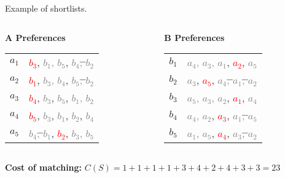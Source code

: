 \documentclass[aspectratio=169,xcolor=dvipsnames]{beamer}
\begin{document}
\begin{frame}{Example of shortlists.}
    \begin{columns}[t]
    \begin{column}{0.45\textwidth}
      \textbf{A Preferences}\\[6pt]
      \begin{tabular}{r@{: }l}
        $a_1$ & \textcolor{red}{$b_3$}, \textcolor{gray}{$b_1$, $b_5$}, \textcolor{gray}{\sout{$b_4$, $b_2$}} \\
        $a_2$ & \textcolor{red}{$b_1$}, \textcolor{gray}{$b_3$, $b_4$}, \textcolor{gray}{\sout{$b_5$, $b_2$}} \\
        $a_3$ & \textcolor{red}{$b_4$}, \textcolor{gray}{$b_3$}, \textcolor{gray}{\sout{$b_5$}}, \textcolor{gray}{$b_1$, $b_2$} \\
        $a_4$ & \textcolor{red}{$b_5$}, \textcolor{gray}{\sout{$b_3$}}, \textcolor{gray}{$b_1$}, \textcolor{gray}{\sout{$b_2$}}, \textcolor{gray}{$b_4$} \\
        $a_5$ & \textcolor{gray}{\sout{$b_4$, $b_1$}}, \textcolor{red}{$b_2$}, \textcolor{gray}{$b_3$, $b_5$} \\
      \end{tabular}
    \end{column}

    \begin{column}{0.45\textwidth}
      \textbf{B Preferences}\\[6pt]
      \begin{tabular}{r@{: }l}
        $b_1$ & \textcolor{gray}{$a_4$, $a_3$, $a_1$}, \textcolor{red}{$a_2$}, \textcolor{gray}{\sout{$a_5$}} \\
        $b_2$ & \textcolor{gray}{$a_3$}, \textcolor{red}{$a_5$}, \textcolor{gray}{\sout{$a_4$, $a_1$, $a_2$}} \\
        $b_3$ & \textcolor{gray}{$a_5$, $a_3$, $a_2$}, \textcolor{red}{$a_1$}, \textcolor{gray}{\sout{$a_4$}} \\
        $b_4$ & \textcolor{gray}{$a_4$, $a_2$}, \textcolor{red}{$a_3$}, \textcolor{gray}{\sout{$a_1$, $a_5$}} \\
        $b_5$ & \textcolor{gray}{$a_1$, $a_5$}, \textcolor{red}{$a_4$}, \textcolor{gray}{\sout{$a_3$, $a_2$}} \\
      \end{tabular}
    \end{column}
  \end{columns}

  \pause
  \vspace{0.5em}
  \textbf{Cost of matching:} \( C(S) = 1 + 1 + 1 + 1 + 3 + 4 + 2 + 4 + 3 + 3 = 23 \)
\end{frame}
\end{document}
